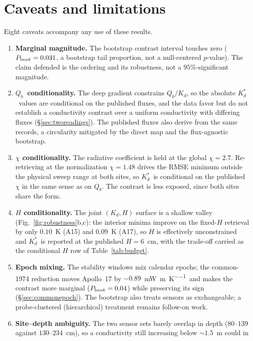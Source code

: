 \documentclass[11pt,a4paper,oneside]{report}
\newcommand{\Kd}{\ensuremath{K_d}}
\newcommand{\Kds}{\ensuremath{K_d^{*}}}
\newcommand{\Qb}{\ensuremath{Q_b}}
\newcommand{\mWmK}{\si{\milli\watt\per\meter\per\kelvin}}
\begin{document}
\section{Caveats and limitations}\label{sec:caveats}
Eight caveats accompany any use of these results.
\begin{enumerate}
  \item \textbf{Marginal magnitude.} The bootstrap contrast interval
    touches zero ($P_{\rm boot}=0.031$, a bootstrap tail proportion,
    not a null-centered $p$-value). The claim defended is the
    ordering and its robustness, not a $95\%$-significant magnitude.
  \item \textbf{\Qb\ conditionality.} The deep gradient constrains
    $\Qb/\Kd$, so the absolute \Kds\ values are conditional on the
    published fluxes, and the data favor but do not establish a
    conductivity contrast over a uniform conductivity with differing
    fluxes (\S\ref{sec:tworeadings}). The published fluxes also
    derive from the same records, a circularity mitigated by the
    direct map and the flux-agnostic bootstrap.
  \item \textbf{$\chi$ conditionality.} The radiative coefficient is
    held at the global $\chi=2.7$. Re-retrieving at the
    \citet{vasavada2012} normalization $\chi=1.48$ drives the RMSE
    minimum outside the physical sweep range at both sites, so \Kds\
    is conditional on the published $\chi$ in the same sense as on
    \Qb. The contrast is less exposed, since both sites share the
    form.
  \item \textbf{$H$ conditionality.} The joint $(\Kd,H)$ surface is a
    shallow valley (Fig.~\ref{fig:robustness}b,c): the interior
    minima improve on the fixed-$H$ retrieval by only $0.10$~K (A15)
    and $0.09$~K (A17), so $H$ is effectively unconstrained and \Kds\
    is reported at the published $H=6$~cm, with the trade-off carried
    as the conditional $H$ row of Table~\ref{tab:budget}.
  \item \textbf{Epoch mixing.} The stability windows mix calendar
    epochs; the common-1974 reduction moves Apollo~17 by $-0.89$~\mWmK\
    and makes the contrast more marginal ($P_{\rm boot}=0.04$)
    while preserving its sign (\S\ref{sec:commonepoch}). The
    bootstrap also treats sensors as exchangeable; a probe-clustered
    (hierarchical) treatment remains follow-on work.
  \item \textbf{Site--depth ambiguity.} The two sensor sets barely
    overlap in depth ($80$--$139$ against $130$--$234$~cm), so a
    conductivity still increasing below ${\sim}1.5$~m could in

\end{enumerate}
\end{document}
